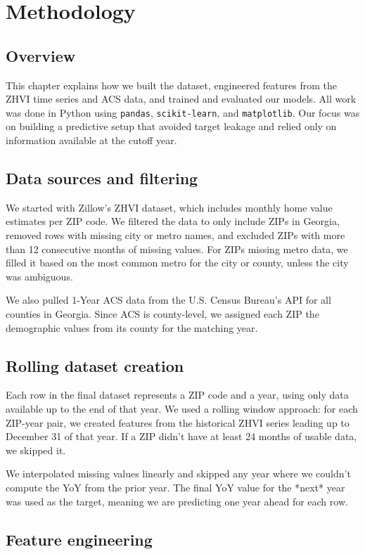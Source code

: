 \chapter{Methodology}
\label{ch:method}

\section{Overview}
This chapter explains how we built the dataset, engineered features from the ZHVI time series and ACS data, and trained and evaluated our models. All work was done in Python using \texttt{pandas}, \texttt{scikit-learn}, and \texttt{matplotlib}. Our focus was on building a predictive setup that avoided target leakage and relied only on information available at the cutoff year.

\section{Data sources and filtering}
We started with Zillow’s ZHVI dataset, which includes monthly home value estimates per ZIP code. We filtered the data to only include ZIPs in Georgia, removed rows with missing city or metro names, and excluded ZIPs with more than 12 consecutive months of missing values. For ZIPs missing metro data, we filled it based on the most common metro for the city or county, unless the city was ambiguous.

We also pulled 1-Year ACS data from the U.S. Census Bureau’s API for all counties in Georgia. Since ACS is county-level, we assigned each ZIP the demographic values from its county for the matching year.

\section{Rolling dataset creation}
Each row in the final dataset represents a ZIP code and a year, using only data available up to the end of that year. We used a rolling window approach: for each ZIP-year pair, we created features from the historical ZHVI series leading up to December 31 of that year. If a ZIP didn’t have at least 24 months of usable data, we skipped it.

We interpolated missing values linearly and skipped any year where we couldn’t compute the YoY from the prior year. The final YoY value for the *next* year was used as the target, meaning we are predicting one year ahead for each row.

\section{Feature engineering}
